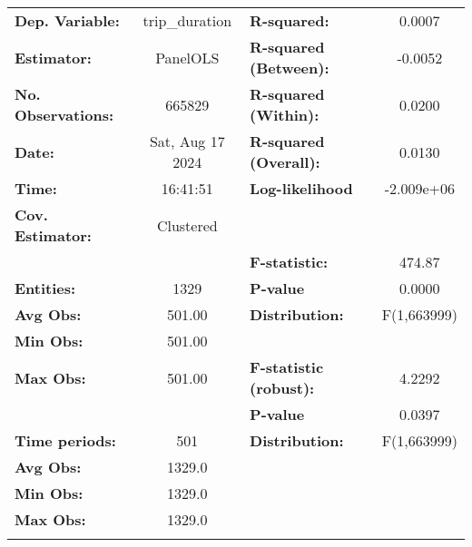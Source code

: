 \begin{center}
\begin{tabular}{lclc}
\toprule
\textbf{Dep. Variable:}    &   trip\_duration   & \textbf{  R-squared:         }   &      0.0007      \\
\textbf{Estimator:}        &      PanelOLS      & \textbf{  R-squared (Between):}  &     -0.0052      \\
\textbf{No. Observations:} &       665829       & \textbf{  R-squared (Within):}   &      0.0200      \\
\textbf{Date:}             &  Sat, Aug 17 2024  & \textbf{  R-squared (Overall):}  &      0.0130      \\
\textbf{Time:}             &      16:41:51      & \textbf{  Log-likelihood     }   &    -2.009e+06    \\
\textbf{Cov. Estimator:}   &     Clustered      & \textbf{                     }   &                  \\
\textbf{}                  &                    & \textbf{  F-statistic:       }   &      474.87      \\
\textbf{Entities:}         &        1329        & \textbf{  P-value            }   &      0.0000      \\
\textbf{Avg Obs:}          &       501.00       & \textbf{  Distribution:      }   &   F(1,663999)    \\
\textbf{Min Obs:}          &       501.00       & \textbf{                     }   &                  \\
\textbf{Max Obs:}          &       501.00       & \textbf{  F-statistic (robust):} &      4.2292      \\
\textbf{}                  &                    & \textbf{  P-value            }   &      0.0397      \\
\textbf{Time periods:}     &        501         & \textbf{  Distribution:      }   &   F(1,663999)    \\
\textbf{Avg Obs:}          &       1329.0       & \textbf{                     }   &                  \\
\textbf{Min Obs:}          &       1329.0       & \textbf{                     }   &                  \\
\textbf{Max Obs:}          &       1329.0       & \textbf{                     }   &                  \\
\textbf{}                  &                    & \textbf{                     }   &                  \\
\bottomrule

\end{tabular}
\end{center}
